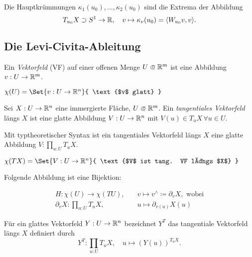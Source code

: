 \documentclass{cheat-sheet}
\begin{document}
\begin{satz}
  Die Hauptkrümmungen $\kappa_1(u_0), ..., \kappa_2(u_0)$ sind die Extrema der Abbildung
  \[ T_{u_0} X \supset S^1 \to \mathbb{R}, \quad v \mapsto \kappa_v(u_0) = \langle W_{u_0} v, v \rangle. \]
\end{satz}


\subsection{Die Levi-Civita-Ableitung}

\begin{defn}
  Ein \emph{Vektorfeld} (VF) auf einer offenen Menge $U \opn \R^m$ ist eine Abbildung $v : U \to \mathbb{R}^m$.
\end{defn}

\begin{nota}
  $\chi(U) = \Set{ v : U \to \R^n }{ \text{$v$ glatt} }$
\end{nota}

\begin{defn}
  Sei $X : U \to \mathbb{R}^n$ eine immergierte Fläche, $U \opn \R^m$. Ein \emph{tangentiales Vektorfeld} längs $X$ ist eine glatte Abbildung $V : U \to \mathbb{R}^n$ mit $V(u) \in T_u X \, \forall u \in U$.
\end{defn}

\begin{bem}
  Mit typtheoretischer Syntax ist ein tangentiales Vektorfeld längs $X$ eine glatte Abbildung $V : \prod_{u : U} T_u X$.
\end{bem}

\begin{nota}
  $\chi(TX) = \Set{ V : U \to \R^n }{ \text{$V$ ist tang. VF längs $X$} }$
\end{nota}

\begin{bem}
  Folgende Abbildung ist eine Bijektion:

  \begin{align*}
     H : \chi(U) \to \chi(TU), \quad &v \mapsto v^{\wedge} \coloneqq \partial_v X, \text{ wobei}\\
     \partial_v X : \prod_{u : U} T_u X, \quad &u \mapsto \partial_{v(u)} X(u)
   \end{align*} 
\end{bem}

\begin{nota}
  Für ein glattes Vektorfeld $Y : U \to \mathbb{R}^n$ bezeichnet $Y^T$ das tangentiale Vektorfeld längs $X$ definiert durch
  \[ Y^T : \prod_{u : U} T_u X, \quad u \mapsto (Y(u))^{T_u X}. \]
\end{nota}
\end{document}

